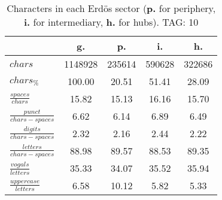 \begin{table}[h!]
\begin{center}
\begin{tabular}{| l || c | c | c | c |}\hline
 & {\bf g.} & {\bf p.} & {\bf i.} & {\bf h.} \\\hline\hline
$chars$ & 1148928  & 235614  & 590628  & 322686 \\
$chars_{\%}$ & 100.00  & 20.51  & 51.41  & 28.09 \\\hline
$\frac{spaces}{chars}$ & 15.82  & 15.13  & 16.16  & 15.70 \\
$\frac{punct}{chars-spaces}$ & 6.62  & 6.14  & 6.89  & 6.49 \\
$\frac{digits}{chars-spaces}$ & 2.32  & 2.16  & 2.44  & 2.22 \\\hline
$\frac{letters}{chars-spaces}$ & 88.98  & 89.57  & 88.53  & 89.35 \\
$\frac{vogals}{letters}$ & 35.33  & 34.07  & 35.52  & 35.94 \\
$\frac{uppercase}{letters}$ & 6.58  & 10.12  & 5.82  & 5.33 \\\hline
\end{tabular}
\caption{Characters in each Erd\"os sector ({{\bf p.}} for periphery, {{\bf i.}} for intermediary, 
    {{\bf h.}} for hubs). TAG: 10}
\end{center}
\end{table}
